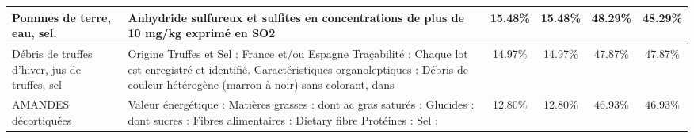 \begin{tabular}{p{5cm}p{5cm}cccc}
                                                                                                                                                                                                                                                               Pommes de terre, eau, sel. &                                                                                                                                                                                                                                  Anhydride sulfureux et sulfites en  \newline concentrations de plus de 10 mg/kg  \newline exprimé en SO2 &  15.48\% &  15.48\% &  48.29\% &   48.29\% \\ \hline
                                                                                                                                                                                                                                           Débris de truffes d'hiver, jus de truffes, sel &                                               \newline Origine Truffes et Sel          :           France et/ou Espagne  \newline   \newline Traçabilité                            :          Chaque lot est enregistré et identifié.  \newline   \newline Caractéristiques organoleptiques : Débris de couleur hétérogène (marron à noir)  sans colorant, dans  &  14.97\% &  14.97\% &  47.87\% &   47.87\% \\ \hline
                                                                                                                                                                                                                                                                     AMANDES décortiquées &                                                                                                       Valeur énergétique :  \newline      Matières grasses :   \newline           dont ac gras saturés :  \newline      Glucides :  \newline           dont sucres :   \newline      Fibres alimentaires :        Dietary fibre  \newline      Protéines :  \newline      Sel :   &  12.80\% &  12.80\% &  46.93\% &   46.93\% \\ \hline

\end{tabular}
